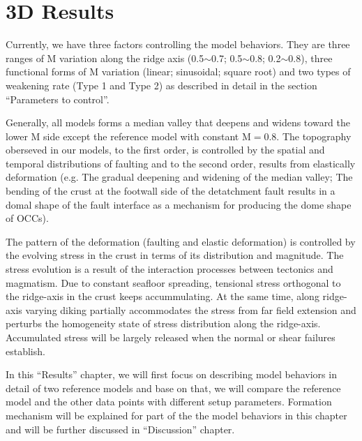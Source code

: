 \pagebreak
\section{3D Results}
Currently, we have three factors controlling the model behaviors. They are three ranges of M variation along the ridge axis (0.5$\sim$0.7; 0.5$\sim$0.8; 0.2$\sim$0.8), three functional forms of M variation (linear; sinusoidal; square root) and two types of weakening rate (Type 1 and Type 2) as described in detail in the section ``Parameters to control''. 

Generally, all models forms a median valley that deepens and widens toward the lower M side except the reference model with constant M$=0.8$. The topography oberseved in our models, to the first order, is controlled by the spatial and temporal distributions of faulting and to the second order, results from elastically deformation (e.g. The gradual deepening and widening of the median valley; The bending of the crust at the footwall side of the detatchment fault results in a domal shape of the fault interface as a mechanism for producing the dome shape of OCCs). 

The pattern of the deformation (faulting and elastic deformation) is controlled by the evolving stress in the crust in terms of its distribution and magnitude. The stress evolution is a result of the interaction processes between tectonics and magmatism. Due to constant seafloor spreading, tensional stress orthogonal to the ridge-axis in the crust keeps accummulating. At the same time, along ridge-axis varying diking partially accommodates the stress from far field extension and perturbs the homogeneity state of stress distribution along the ridge-axis. Accumulated stress will be largely released when the normal or shear failures establish.

In this ``Results'' chapter, we will first focus on describing model behaviors in detail of two reference models and base on that, we will compare the reference model and the other data points with different setup parameters. Formation mechanism will be explained for part of the the model behaviors in this chapter and will be further discussed in ``Discussion'' chapter. 

